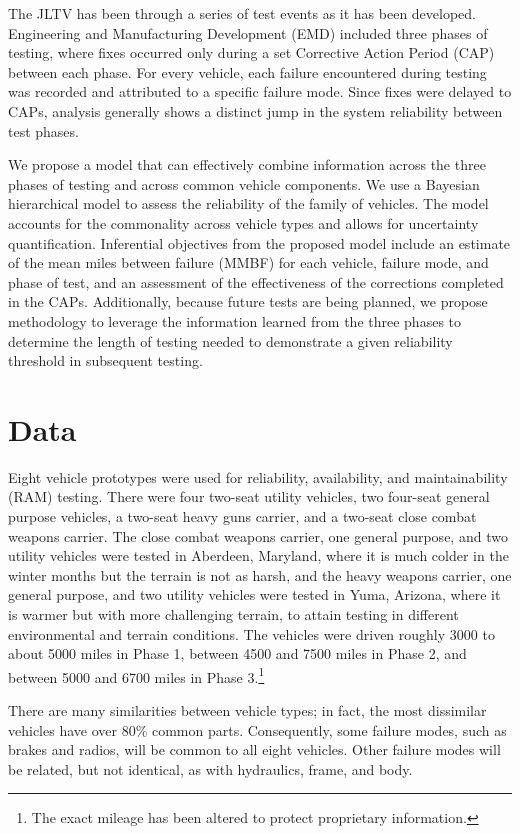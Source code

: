 \documentclass[12pt]{article}
\begin{document}
The JLTV has been through a series of test events as it has been developed.
Engineering and Manufacturing Development (EMD) included three phases of
testing, where fixes occurred only during a set Corrective Action Period (CAP)
between each phase. For every vehicle, each failure encountered during testing
was recorded and attributed to a specific failure mode.  Since fixes were
delayed to CAPs, analysis generally shows a distinct jump in the system
reliability between test phases.

We propose a model that can effectively combine information across the three
phases of testing and across common vehicle components. We use a Bayesian
hierarchical model to assess the reliability of the family of vehicles. The
model accounts for the commonality across vehicle types and allows for
uncertainty quantification. Inferential objectives from the proposed model
include an estimate of the mean miles between failure (MMBF) for each vehicle,
failure mode, and phase of test, and an assessment of the effectiveness of the
corrections completed in the CAPs. Additionally, because future tests are being
planned, we propose methodology to leverage the information learned from the
three phases to determine the length of testing needed to demonstrate a given
reliability threshold in subsequent testing.

\section{Data}
Eight vehicle prototypes were used for reliability, availability,
and maintainability (RAM) testing. There were four two-seat utility vehicles,
two four-seat general purpose vehicles, a two-seat heavy guns carrier, and a
two-seat close combat weapons carrier. The close combat weapons carrier, one
general purpose, and two utility vehicles were tested in Aberdeen, Maryland,
where it is much colder in the winter months but the terrain is not as harsh,
and the heavy weapons carrier, one general purpose, and two utility vehicles
were tested in Yuma, Arizona, where it is warmer but with more challenging
terrain, to attain testing in different environmental and terrain conditions.
The vehicles were driven roughly 3000 to about 5000 miles in Phase 1, between
4500 and 7500 miles in Phase 2, and between 5000 and 6700 miles in Phase
3.\footnote{The exact mileage has been altered to protect proprietary
information.}

There are many similarities between vehicle types; in fact, the most dissimilar
vehicles have over 80\% common parts. Consequently, some failure modes, such as
brakes and radios, will be common to all eight vehicles. Other failure modes
will be related, but not identical, as with hydraulics, frame, and body.
\end{document}

